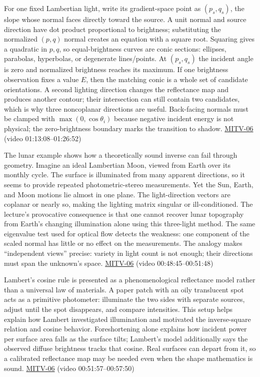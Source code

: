 For one fixed Lambertian light, write its gradient-space point as \((p_s,q_s)\), the slope whose normal faces directly toward the source. A unit normal and source direction have dot product proportional to brightness; substituting the normalized \((p,q)\) normal creates an equation with a square root. Squaring gives a quadratic in \(p,q\), so equal-brightness curves are conic sections: ellipses, parabolas, hyperbolas, or degenerate lines/points. At \((p_s,q_s)\) the incident angle is zero and normalized brightness reaches its maximum. If one brightness observation fixes a value \(E\), then the matching conic is a whole set of candidate orientations. A second lighting direction changes the reflectance map and produces another contour; their intersection can still contain two candidates, which is why three noncoplanar directions are useful. Back-facing normals must be clamped with \(\max(0,\cos\theta_i)\) because negative incident energy is not physical; the zero-brightness boundary marks the transition to shadow. \hyperref[04-visual-computing-ii-ch036-mitv-06---photometric-stereo-noise-gain-error-amplification-eigenvalues-and-eigenvectors-review]{MITV-06} (video 01:13:08--01:26:52)

The lunar example shows how a theoretically sound inverse can fail through geometry. Imagine an ideal Lambertian Moon, viewed from Earth over its monthly cycle. The surface is illuminated from many apparent directions, so it seems to provide repeated photometric-stereo measurements. Yet the Sun, Earth, and Moon motions lie almost in one plane. The light-direction vectors are coplanar or nearly so, making the lighting matrix singular or ill-conditioned. The lecture's provocative consequence is that one cannot recover lunar topography from Earth's changing illumination alone using this three-light method. The same eigenvalue test used for optical flow detects the weakness: one component of the scaled normal has little or no effect on the measurements. The analogy makes ``independent views'' precise: variety in light count is not enough; their directions must span the unknown's space. \hyperref[04-visual-computing-ii-ch036-mitv-06---photometric-stereo-noise-gain-error-amplification-eigenvalues-and-eigenvectors-review]{MITV-06} (video 00:48:45--00:51:48)

Lambert's cosine rule is presented as a phenomenological reflectance model rather than a universal law of materials. A paper patch with an oily translucent spot acts as a primitive photometer: illuminate the two sides with separate sources, adjust until the spot disappears, and compare intensities. This setup helps explain how Lambert investigated illumination and motivated the inverse-square relation and cosine behavior. Foreshortening alone explains how incident power per surface area falls as the surface tilts; Lambert's model additionally says the observed diffuse brightness tracks that cosine. Real surfaces can depart from it, so a calibrated reflectance map may be needed even when the shape mathematics is sound. \hyperref[04-visual-computing-ii-ch036-mitv-06---photometric-stereo-noise-gain-error-amplification-eigenvalues-and-eigenvectors-review]{MITV-06} (video 00:51:57--00:57:50)

